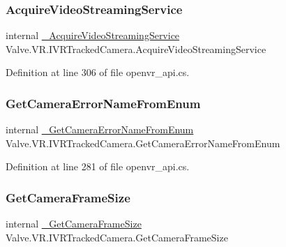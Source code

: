 \subsubsection{\texorpdfstring{AcquireVideoStreamingService}{AcquireVideoStreamingService}}
{\footnotesize\ttfamily internal \mbox{\hyperlink{struct_valve_1_1_v_r_1_1_i_v_r_tracked_camera_ac535815424bd4d396ab6ddc1e92065e5}{\+\_\+\+Acquire\+Video\+Streaming\+Service}} Valve.\+V\+R.\+I\+V\+R\+Tracked\+Camera.\+Acquire\+Video\+Streaming\+Service}



Definition at line 306 of file openvr\+\_\+api.\+cs.

\mbox{\label{struct_valve_1_1_v_r_1_1_i_v_r_tracked_camera_ae0cfbea5e32b404d3e27f9c23f4b8a00}} 
\subsubsection{\texorpdfstring{GetCameraErrorNameFromEnum}{GetCameraErrorNameFromEnum}}
{\footnotesize\ttfamily internal \mbox{\hyperlink{struct_valve_1_1_v_r_1_1_i_v_r_tracked_camera_a0bf8d42b5ed4c30eb09d04124dfb621e}{\+\_\+\+Get\+Camera\+Error\+Name\+From\+Enum}} Valve.\+V\+R.\+I\+V\+R\+Tracked\+Camera.\+Get\+Camera\+Error\+Name\+From\+Enum}



Definition at line 281 of file openvr\+\_\+api.\+cs.

\mbox{\label{struct_valve_1_1_v_r_1_1_i_v_r_tracked_camera_ac89b29ee793a06a78b12f79829bae8c1}} 
\subsubsection{\texorpdfstring{GetCameraFrameSize}{GetCameraFrameSize}}
{\footnotesize\ttfamily internal \mbox{\hyperlink{struct_valve_1_1_v_r_1_1_i_v_r_tracked_camera_a7a7151ceb5ce18c098884b07ba847502}{\+\_\+\+Get\+Camera\+Frame\+Size}} Valve.\+V\+R.\+I\+V\+R\+Tracked\+Camera.\+Get\+Camera\+Frame\+Size}



